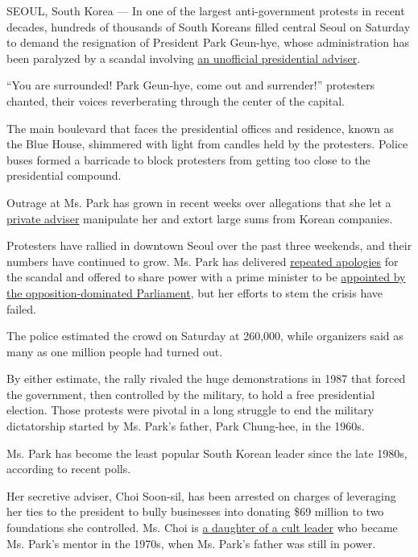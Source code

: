 SEOUL, South Korea --- In one of the largest anti-government protests in
recent decades, hundreds of thousands of South Koreans filled central
Seoul on Saturday to demand the resignation of President Park Geun-hye,
whose administration has been paralyzed by a scandal involving
\href{http://www.nytimes3xbfgragh.onion/2016/11/12/world/asia/south-korea-park-geun-hye.html}{an
unofficial presidential adviser}.

``You are surrounded! Park Geun-hye, come out and surrender!''
protesters chanted, their voices reverberating through the center of the
capital.

The main boulevard that faces the presidential offices and residence,
known as the Blue House, shimmered with light from candles held by the
protesters. Police buses formed a barricade to block protesters from
getting too close to the presidential compound.

Outrage at Ms. Park has grown in recent weeks over allegations that she
let a
\href{http://www.nytimes3xbfgragh.onion/2016/11/06/world/asia/south-koreans-ashamed-over-les-secretive-adviser.html}{private
adviser} manipulate her and extort large sums from Korean companies.

Protesters have rallied in downtown Seoul over the past three weekends,
and their numbers have continued to grow. Ms. Park has delivered
\href{http://www.nytimes3xbfgragh.onion/2016/11/04/world/asia/south-korea-park-geun-hye-investigation.html}{repeated
apologies} for the scandal and offered to share power with a prime
minister to be
\href{http://www.nytimes3xbfgragh.onion/2016/11/08/world/asia/south-korea-park-choi-scandal-parliament.html}{appointed
by the opposition-dominated Parliament}, but her efforts to stem the
crisis have failed.

The police estimated the crowd on Saturday at 260,000, while organizers
said as many as one million people had turned out.

By either estimate, the rally rivaled the huge demonstrations in 1987
that forced the government, then controlled by the military, to hold a
free presidential election. Those protests were pivotal in a long
struggle to end the military dictatorship started by Ms. Park's father,
Park Chung-hee, in the 1960s.

Ms. Park has become the least popular South Korean leader since the late
1980s, according to recent polls.

Her secretive adviser, Choi Soon-sil, has been arrested on charges of
leveraging her ties to the president to bully businesses into donating
\$69 million to two foundations she controlled. Ms. Choi is
\href{http://www.nytimes3xbfgragh.onion/2016/11/06/world/asia/south-koreans-ashamed-over-les-secretive-adviser.html}{a
daughter of a cult leader} who became Ms. Park's mentor in the 1970s,
when Ms. Park's father was still in power.

